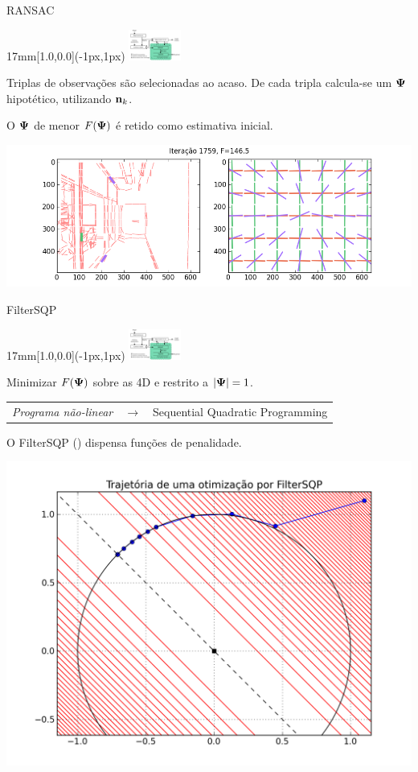 \begin{frame}{RANSAC}
  \begin{textblock*}{17mm}[1.0,0.0](\paperwidth-1px,1px)
    \includegraphics[width=17mm]{blocos_s4.png}
  \end{textblock*}

  Triplas de observações são selecionadas ao acaso. De  cada tripla calcula-se um ${\boldsymbol{\Psi}}$ hipotético, utilizando
  ${\mathbf{n}}_k$.
  
  O ${\boldsymbol{\Psi}}$ de menor $F({\boldsymbol{\Psi}})$ é retido como estimativa inicial.
  \centerline{\includegraphics[height=8\baselineskip]{rdemo0014.png}}
\end{frame}


\begin{frame}{FilterSQP}
  \begin{textblock*}{17mm}[1.0,0.0](\paperwidth-1px,1px)
    \includegraphics[width=17mm]{blocos_s4.png}
  \end{textblock*}
  Minimizar $F({\boldsymbol{\Psi}})$ sobre as 4D e restrito a
  $|{\boldsymbol{\Psi}}|=1$.

  \begin{tabular}{rcl}
    {\em Programa não-linear} & $\rightarrow$ & \parbox{12em}{ Sequential Quadratic Programming}
  \end{tabular}
  
  O FilterSQP (\cite{Fletcher2002}) dispensa funções de penalidade.
  \centerline{
    \includegraphics[height=9\baselineskip]{sqp_traj.png}
  }
\end{frame}

